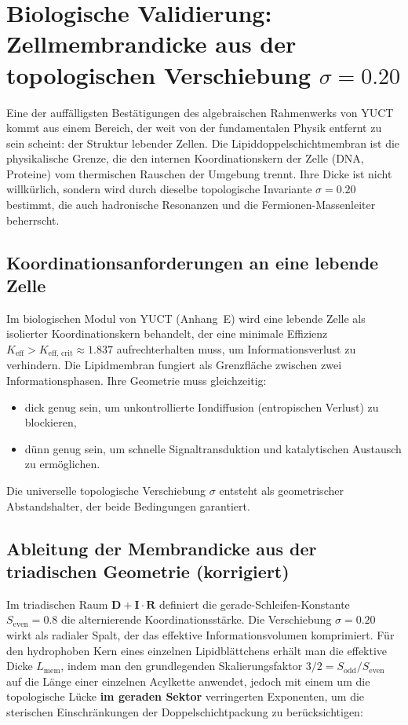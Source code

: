 \documentclass[12pt,a4paper]{article}
\begin{document}
	\section*{Biologische Validierung: Zellmembrandicke aus der topologischen Verschiebung \(\sigma = 0.20\)}
	\label{sec:membrane}
	
	Eine der auffälligsten Bestätigungen des algebraischen Rahmenwerks von YUCT kommt aus einem Bereich, der weit von der fundamentalen Physik entfernt zu sein scheint: der Struktur lebender Zellen. Die Lipiddoppelschichtmembran ist die physikalische Grenze, die den internen Koordinationskern der Zelle (DNA, Proteine) vom thermischen Rauschen der Umgebung trennt. Ihre Dicke ist nicht willkürlich, sondern wird durch dieselbe topologische Invariante \(\sigma = 0.20\) bestimmt, die auch hadronische Resonanzen und die Fermionen-Massenleiter beherrscht.
	
	\subsection*{Koordinationsanforderungen an eine lebende Zelle}
	
	Im biologischen Modul von YUCT (Anhang~E) wird eine lebende Zelle als isolierter Koordinationskern behandelt, der eine minimale Effizienz \(K_{\mathrm{eff}} > K_{\mathrm{eff,\,crit}} \approx 1.837\) aufrechterhalten muss, um Informationsverlust zu verhindern. Die Lipidmembran fungiert als Grenzfläche zwischen zwei Informationsphasen. Ihre Geometrie muss gleichzeitig:
	\begin{itemize}
		\item dick genug sein, um unkontrollierte Iondiffusion (entropischen Verlust) zu blockieren,
		\item dünn genug sein, um schnelle Signaltransduktion und katalytischen Austausch zu ermöglichen.
	\end{itemize}
	Die universelle topologische Verschiebung \(\sigma\) entsteht als geometrischer Abstandshalter, der beide Bedingungen garantiert.
	
	\subsection*{Ableitung der Membrandicke aus der triadischen Geometrie (korrigiert)}
	
	Im triadischen Raum \(\mathbf{D} + \mathbf{I}\!\cdot\!\mathbf{R}\) definiert die gerade-Schleifen-Konstante \(S_{\mathrm{even}} = 0.8\) die alternierende Koordinationsstärke. Die Verschiebung \(\sigma = 0.20\) wirkt als radialer Spalt, der das effektive Informationsvolumen komprimiert. Für den hydrophoben Kern eines einzelnen Lipidblättchens erhält man die effektive Dicke \(L_{\mathrm{mem}}\), indem man den grundlegenden Skalierungsfaktor \(3/2 = S_{\mathrm{odd}}/S_{\mathrm{even}}\) auf die Länge einer einzelnen Acylkette anwendet, jedoch mit einem um die topologische Lücke \textbf{im geraden Sektor} verringerten Exponenten, um die sterischen Einschränkungen der Doppelschichtpackung zu berücksichtigen:
	
\end{document}
